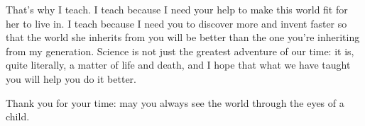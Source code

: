 That's why I teach. I teach because I need your help to make this world
fit for her to live in. I teach because I need you to discover more and
invent faster so that the world she inherits from you will be better
than the one you're inheriting from my generation. Science is not just
the greatest adventure of our time: it is, quite literally, a matter of
life and death, and I hope that what we have taught you will help you do
it better.

Thank you for your time: may you always see the world through the eyes
of a child.
